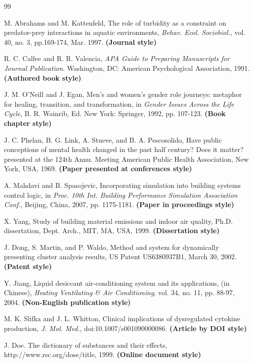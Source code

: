 \documentclass[10.5pt,compsoc]{ICN}
\theoremstyle{mystyle}
\begin{document}
\begin{thebibliography}{99}
 \addtolength{\itemsep}{-1em}
\vspace {1.5mm}

M. Abrahams and M. Kattenfeld, The role of turbidity as a constraint on predator-prey interactions in aquatic environments, \emph{Behav. Ecol. Sociobiol.,} vol. 40, no. 3, pp.169-174, Mar. 1997. \textbf{(Journal style)}

R. C. Calfee and R. R. Valencia, \emph{APA Guide to Preparing Manuscripts for Journal Publication}. Washington, DC: American Psychological Association, 1991. \textbf{(Authored book style)}

J. M. O'Neill and J. Egan, Men's and women's gender role journeys: metaphor for healing, transition, and transformation, in \emph{Gender Issues Across the Life Cycle}, B. R. Wainrib, Ed. New York: Springer, 1992, pp. 107-123. \textbf{(Book chapter style)}

J. C. Phelan, B. G. Link, A. Stueve, and B. A. Pescosolido, Have public conceptions of mental health changed in the past half century? Does it matter? presented at the 124th Annu. Meeting American Public Health Association, New York, USA, 1969. \textbf{(Paper presented at conferences style)}

A. Mahdavi and B. Spasojevic, Incorporating simulation into building systems control logic, in \emph{Proc. 10th Int. Building Performance Simulation Association Conf.}, Beijing, China, 2007, pp. 1175-1181. \textbf{(Paper in proceedings style)}

X. Yang, Study of building material emissions and indoor air quality, Ph.D. dissertation, Dept. Arch., MIT, MA, USA, 1999. \textbf{(Dissertation style)}

J. Dong, S. Martin, and P. Waldo, Method and system for dynamically presenting cluster analysis results, US Patent US6380937B1, March 30, 2002. \textbf{(Patent style)}

Y. Jiang, Liquid desiccant air-conditioning system and its applications, (in Chinese), \emph{Heating Ventilating \& Air Conditioning}, vol. 34, no. 11, pp. 88-97, 2004. \textbf{(Non-English publication style)}

M. K. Slifka and J. L. Whitton, Clinical implications of dysregulated cytokine production, \emph{J. Mol. Med.}, doi:10.1007/s001090000086. \textbf{(Article by DOI style)}

J. Doe. The dictionary of substances and their effects,  http://www.rsc.org/dose/title, 1999. \textbf{(Online document style)}
  \end{thebibliography}
\end{document}
